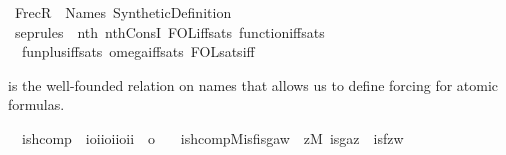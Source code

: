 %
\begin{isabellebody}%
%
%
\isadelimdocument
%
\endisadelimdocument
%
\isatagdocument
%
\isamarkuptrue%
%
\endisatagdocument
{\isafolddocument}%
%
\isadelimdocument
%
\endisadelimdocument
%
\isadelimtheory
%
\endisadelimtheory
%
\isatagtheory
{}\isamarkupfalse%
\ FrecR\ \ Names\ Synthetic{\isacharunderscore}{\kern0pt}Definition\ %
\endisatagtheory
{\isafoldtheory}%
%
\isadelimtheory
\isanewline
%
\endisadelimtheory
\isanewline
{}\isamarkupfalse%
\ sep{\isacharunderscore}{\kern0pt}rules{\isacharprime}{\kern0pt}\ {\isacharequal}{\kern0pt}\ nth{\isacharunderscore}{\kern0pt}{}\ nth{\isacharunderscore}{\kern0pt}ConsI\ FOL{\isacharunderscore}{\kern0pt}iff{\isacharunderscore}{\kern0pt}sats\ function{\isacharunderscore}{\kern0pt}iff{\isacharunderscore}{\kern0pt}sats\isanewline
\ \ fun{\isacharunderscore}{\kern0pt}plus{\isacharunderscore}{\kern0pt}iff{\isacharunderscore}{\kern0pt}sats\ omega{\isacharunderscore}{\kern0pt}iff{\isacharunderscore}{\kern0pt}sats\ FOL{\isacharunderscore}{\kern0pt}sats{\isacharunderscore}{\kern0pt}iff%
\begin{isamarkuptext}%
 is the well-founded relation on names that allows
us to define forcing for atomic formulas.%
\end{isamarkuptext}\isamarkuptrue%
\isamarkupfalse%
\isanewline
\ \ is{\isacharunderscore}{\kern0pt}hcomp\ {\isacharcolon}{\kern0pt}{\isacharcolon}{\kern0pt}\ {\isachardoublequoteopen}{\isacharbrackleft}{\kern0pt}i{\isasymRightarrow}o{\isacharcomma}{\kern0pt}i{\isasymRightarrow}i{\isasymRightarrow}o{\isacharcomma}{\kern0pt}i{\isasymRightarrow}i{\isasymRightarrow}o{\isacharcomma}{\kern0pt}i{\isacharcomma}{\kern0pt}i{\isacharbrackright}{\kern0pt}\ {\isasymRightarrow}\ o{\isachardoublequoteclose}\ \isanewline
\ \ {\isachardoublequoteopen}is{\isacharunderscore}{\kern0pt}hcomp{\isacharparenleft}{\kern0pt}M{\isacharcomma}{\kern0pt}is{\isacharunderscore}{\kern0pt}f{\isacharcomma}{\kern0pt}is{\isacharunderscore}{\kern0pt}g{\isacharcomma}{\kern0pt}a{\isacharcomma}{\kern0pt}w{\isacharparenright}{\kern0pt}\ {\isasymequiv}\ {\isasymexists}z{\isacharbrackleft}{\kern0pt}M{\isacharbrackright}{\kern0pt}{\isachardot}{\kern0pt}\ is{\isacharunderscore}{\kern0pt}g{\isacharparenleft}{\kern0pt}a{\isacharcomma}{\kern0pt}z{\isacharparenright}{\kern0pt}\ {\isasymand}\ is{\isacharunderscore}{\kern0pt}f{\isacharparenleft}{\kern0pt}z{\isacharcomma}{\kern0pt}w{\isacharparenright}{\kern0pt}{\isachardoublequoteclose}\ \isanewline

\end{isabellebody}
